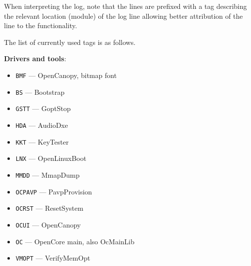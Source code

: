 \documentclass[]{article}
\providecommand{\tightlist}{%
  \setlength{\itemsep}{0pt}\setlength{\parskip}{0pt}}
\begin{document}
\begin{enumerate}
  When interpreting the log, note that the lines are prefixed with a tag describing
  the relevant location (module) of the log line allowing better attribution of the
  line to the functionality.

  The list of currently used tags is as follows.

  \textbf{Drivers and tools}:
  \begin{itemize}
  \tightlist
  \item \texttt{BMF} --- OpenCanopy, bitmap font
  \item \texttt{BS} --- Bootstrap
  \item \texttt{GSTT} --- GoptStop
  \item \texttt{HDA} --- AudioDxe
  \item \texttt{KKT} --- KeyTester
  \item \texttt{LNX} --- OpenLinuxBoot
  \item \texttt{MMDD} --- MmapDump
  \item \texttt{OCPAVP} --- PavpProvision
  \item \texttt{OCRST} --- ResetSystem
  \item \texttt{OCUI} --- OpenCanopy
  \item \texttt{OC} --- OpenCore main, also OcMainLib
  \item \texttt{VMOPT} --- VerifyMemOpt
  \end{itemize}


\end{enumerate}
\end{document}
